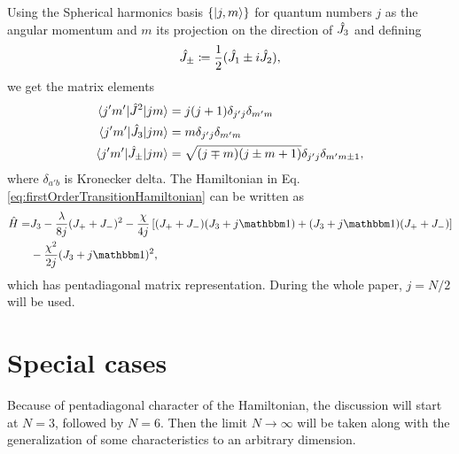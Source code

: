 Using the Spherical harmonics basis $\{\ket{j,m}\}$ for quantum numbers $j$ as the angular momentum and $m$ its projection on the direction of $\hat{J}_3$ and defining
\begin{equation}
    \hat{J}_\pm\coloneqq\frac{1}{2}(\hat{J}_1\pm i\hat{J}_2),
\end{equation}
we get the matrix elements
\begin{align}
    \braket{j'm'|\hat{J}^2|jm} &= j(j+1)\delta_{j'j}\delta_{m'm}\\
    \braket{j'm'|\hat{J}_3|jm} &= m \delta_{j'j}\delta_{m'm}\\
    \braket{j'm'|\hat{J}_\pm|jm} &= \sqrt{(j\mp m)(j\pm m+1)}\delta_{j'j}\delta_{m'm\pm 1},
\end{align}
where $\delta_{a'b}$ is Kronecker delta. The Hamiltonian in Eq. \ref{eq:firstOrderTransitionHamiltonian} can be written as
\begin{equation}
\begin{split}
        \HH =& J_3-\frac{\lambda}{8j}(J_++J_-)^2-\frac{\chi}{4j}\left[(J_++J_-)(J_3+j\Id)+(J_3+j\Id)(J_++J_-)\right]\\
        &-\frac{\chi^2}{2j}(J_3+j\Id)^2,
\end{split}
\end{equation}
which has pentadiagonal matrix representation. During the whole paper, $j=N/2$ will be used. 











\section{Special cases}
Because of pentadiagonal character of the Hamiltonian, the discussion will start at $N=3$, followed by $N=6$. Then the limit $N\rightarrow\infty$ will be taken along with the generalization of some characteristics to an arbitrary dimension. 

